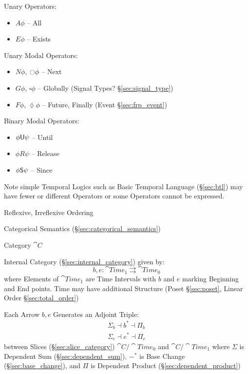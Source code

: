 Unary Operators:
\begin{itemize}
  \item $A\phi$ -- All
  \item $E\phi$ -- Exists
\end{itemize}

Unary Modal Operators:
\begin{itemize}
  \item $N\phi$, $\ocircle\phi$ -- Next
  \item $G\phi$, $\square\phi$ -- Globally
    (Signal Types? \S\ref{sec:signal_type}) %
  \item $F\phi$, $\lozenge\phi$ -- Future, Finally (Event
    \S\ref{sec:frp_event})
\end{itemize}

Binary Modal Operators:
\begin{itemize}
  \item $\phi \mathsf{U} \psi$ -- Until
  \item $\phi R \psi$ -- Release
  \item $\phi \mathsf{S} \psi$ -- Since
\end{itemize}

\fist Note simple Temporal Logics such as Basic Temporal Language
(\S\ref{sec:btl}) may have fewer or different Operators or some
Operators cannot be expressed.

Reflexive, Irreflexive Ordering


\asterism


Categorical Semantics (\S\ref{sec:categorical_semantics})

Category $\cat{C}$

Internal Category (\S\ref{sec:internal_category}) given by:
\[
  b,e : \cat{Time}_1 \rightrightarrows \cat{Time}_0
\]
where Elements of $\cat{Time}_1$ are Time Intervals with $b$ and $e$
marking Beginning and End points. Time may have additional Structure
(Poset \S\ref{sec:poset}, Linear Order \S\ref{sec:total_order})

Each Arrow $b,e$ Generates an Adjoint Triple:
\begin{align*}
  \Sigma_b \dashv b^* \dashv \Pi_b \\
  \Sigma_e \dashv e^* \dashv \Pi_e
\end{align*}
between Slices (\S\ref{sec:slice_category}) $\cat{C}/\cat{Time}_0$ and
$\cat{C}/\cat{Time}_1$ where $\Sigma$ is Dependent Sum
(\S\ref{sec:dependent_sum}), $-^*$ is Base Change
(\S\ref{sec:base_change}), and $\Pi$ is Dependent Product
(\S\ref{sec:dependent_product})

